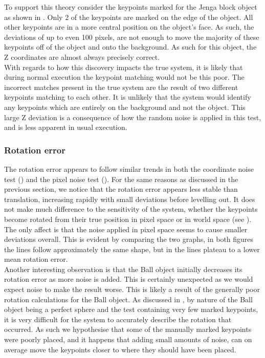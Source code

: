 To support this theory consider the keypoints marked for the Jenga block object as shown in . Only 2 of the keypoints are marked on the edge of the object. All other keypoints are in a more central position on the object's face. As such, the deviations of up to even 100 pixels, are not enough to move the majority of these keypoints off of the object and onto the background. As such for this object, the Z coordinates are almost always precisely correct.\\

With regards to how this discovery impacts the true system, it is likely that during normal execution the keypoint matching would not be this poor. The incorrect matches present in the true system are the result of two different keypoints matching to each other. It is unlikely that the system would identify any keypoints which are entirely on the background and not the object. This large Z deviation is a consequence of how the random noise is applied in this test, and is less apparent in usual execution.

\subsubsection{Rotation error}
The rotation error appears to follow similar trends in both the coordinate noise test () and the pixel noise test (). For the same reasons as discussed in the previous section, we notice that the rotation error appears less stable than translation, increasing rapidly with small deviations before levelling out. It does not make much difference to the sensitivity of the system, whether the keypoints become rotated from their true position in pixel space or in world space (see ). The only affect is that the noise applied in pixel space seems to cause smaller deviations overall. This is evident by comparing the two graphs, in both figures the lines follow approximately the same shape, but in  the lines plateau to a lower mean rotation error.\\

Another interesting observation is that the Ball object initially decreases its rotation error as more noise is added. This is certainly unexpected as we would expect noise to make the result worse. This is likely a result of the generally poor rotation calculations for the Ball object. As discussed in , by nature of the Ball object being a perfect sphere and the test containing very few marked keypoints, it is very difficult for the system to accurately describe the rotation that occurred. As such we hypothesise that some of the manually marked keypoints were poorly placed, and it happens that adding small amounts of noise, can on average move the keypoints closer to where they should have been placed.

